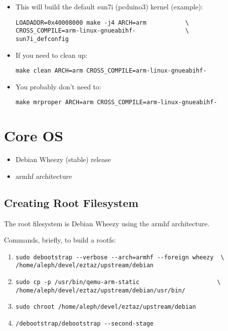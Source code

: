 \begin{itemize}
  \item{This will build the default sun7i (pcduino3) kernel (example):
  
  \begin{verbatim}
LOADADDR=0x40008000 make -j4 ARCH=arm           \
CROSS_COMPILE=arm-linux-gnueabihf-              \
sun7i_defconfig
  \end{verbatim}
  }

  \item{If you need to clean up:
  
  \begin{verbatim}
make clean ARCH=arm CROSS_COMPILE=arm-linux-gnueabihf-
  \end{verbatim}
  }

  \item{You probably don't need to:
  
  \begin{verbatim}
make mrproper ARCH=arm CROSS_COMPILE=arm-linux-gnueabihf-
  \end{verbatim}
  }
\end{itemize}


\section{Core OS}
\begin{itemize}
  \item{Debian Wheezy (stable) release}
  \item{armhf architecture}
\end{itemize}

\subsection{Creating Root Filesystem}
The root filesystem is Debian Wheezy using the armhf architecture.

Commands, briefly, to build a rootfs:

\begin{enumerate}
  \item{
  \begin{verbatim}
sudo debootstrap --verbose --arch=armhf --foreign wheezy  \
/home/aleph/devel/eztaz/upstream/debian
  \end{verbatim}
  }

  \item{
  \begin{verbatim}
sudo cp -p /usr/bin/qemu-arm-static                      \
/home/aleph/devel/eztaz/upstream/debian/usr/bin/
  \end{verbatim}
  }

  \item{
\verb|sudo chroot /home/aleph/devel/eztaz/upstream/debian|
  }

  \item{
\verb|/debootstrap/debootstrap --second-stage|
  }

\end{enumerate}


